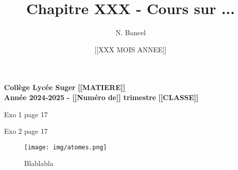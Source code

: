 \documentclass[a4paper,12pt]{article}
\title{Chapitre XXX - Cours sur ...}
\author{N. Bancel}
\date{[[XXX MOIS ANNEE]]}
\begin{document}
\textbf{Collège Lycée Suger}
\hfill
\textbf{[[MATIERE]]} \\

\textbf{Année 2024-2025 - [[Numéro de]] trimestre}
\hfill
\textbf{[[CLASSE]]} \par

{\let\newpage\relax\maketitle}


\begin{tcolorbox}[colback=blue!10!white, colframe=blue!75!black, title=Concepts importants à retenir]
  \begin{compactitem}
    \item Exo 1 page 17
    \item Exo 2 page 17
  \end{compactitem}
\end{tcolorbox}



\begin{figure}[H]
  \centering
  \texttt{[image: img/atomes.png]}
  \captionsetup{labelformat=empty}
  \caption{\label{} Blablabla}
\end{figure}
\end{document}
